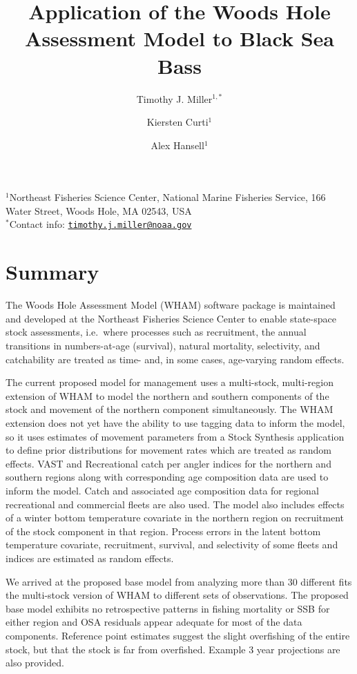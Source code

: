 \documentclass[
]{article}
\title{Application of the Woods Hole Assessment Model to Black Sea Bass}
\author{Timothy J. Miller\(^{1,*}\) \and Kiersten Curti\(^1\) \and Alex Hansell\(^1\)}
\date{}
\begin{document}
\maketitle

\(^1\)Northeast Fisheries Science Center, National Marine Fisheries Service, 166 Water Street, Woods Hole, MA 02543, USA\\
\(^*\)Contact info: \href{mailto:timothy.j.miller@noaa.gov}{\nolinkurl{timothy.j.miller@noaa.gov}}

\pagebreak

\hypertarget{summary}{%
\section*{Summary}\label{summary}}

The Woods Hole Assessment Model (WHAM) software package is maintained and developed at the Northeast Fisheries Science Center to enable state-space stock assessments, i.e.~where processes such as recruitment, the annual transitions in numbers-at-age (survival), natural mortality, selectivity, and catchability are treated as time- and, in some cases, age-varying random effects.

The current proposed model for management uses a multi-stock, multi-region extension of WHAM to model the northern and southern components of the stock and movement of the northern component simultaneously. The WHAM extension does not yet have the ability to use tagging data to inform the model, so it uses estimates of movement parameters from a Stock Synthesis application to define prior distributions for movement rates which are treated as random effects. VAST and Recreational catch per angler indices for the northern and southern regions along with corresponding age composition data are used to inform the model. Catch and associated age composition data for regional recreational and commercial fleets are also used. The model also includes effects of a winter bottom temperature covariate in the northern region on recruitment of the stock component in that region. Process errors in the latent bottom temperature covariate, recruitment, survival, and selectivity of some fleets and indices are estimated as random effects.

We arrived at the proposed base model from analyzing more than 30 different fits the multi-stock version of WHAM to different sets of observations. The proposed base model exhibits no retrospective patterns in fishing mortality or SSB for either region and OSA residuals appear adequate for most of the data components. Reference point estimates suggest the slight overfishing of the entire stock, but that the stock is far from overfished. Example 3 year projections are also provided.
\end{document}
